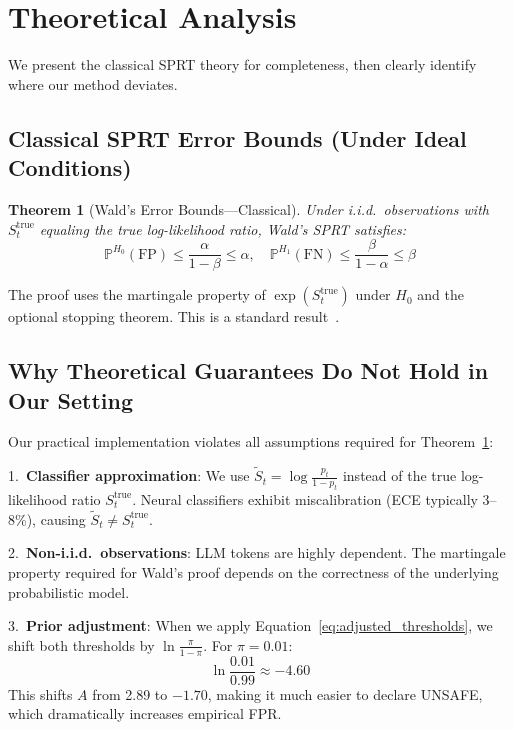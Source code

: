 \documentclass[acmtjournal, acmnowidth]{acmart}
\newcommand{\Hzero}{H_0}
\newcommand{\Hone}{H_1}
\newcommand{\Prob}{\mathbb{P}}
\newtheorem{theorem}{Theorem}[section]
\theoremstyle{definition}
\begin{document}
\section{Theoretical Analysis}

We present the classical SPRT theory for completeness, then clearly identify where our method deviates.

\subsection{Classical SPRT Error Bounds (Under Ideal Conditions)}

\begin{theorem}[Wald's Error Bounds---Classical]
\label{thm:classical_wald}
Under i.i.d.\ observations with $S_t^{\text{true}}$ equaling the true log-likelihood ratio, Wald's SPRT satisfies:
\begin{equation}
\Prob^{\Hzero}(\text{FP}) \leq \frac{\alpha}{1-\beta} \leq \alpha, \quad \Prob^{\Hone}(\text{FN}) \leq \frac{\beta}{1-\alpha} \leq \beta
\end{equation}
\end{theorem}

The proof uses the martingale property of $\exp(S_t^{\text{true}})$ under $\Hzero$ and the optional stopping theorem. This is a standard result~\cite{wald1945}.

\subsection{Why Theoretical Guarantees Do Not Hold in Our Setting}
\label{sec:why_guarantees_dont_hold}

Our practical implementation violates all assumptions required for Theorem~\ref{thm:classical_wald}:

1.~\textbf{Classifier approximation}: We use $\tilde{S}_t = \log\frac{p_t}{1-p_t}$ instead of the true log-likelihood ratio $S_t^{\text{true}}$. Neural classifiers exhibit miscalibration (ECE typically 3--8\%), causing $\tilde{S}_t \neq S_t^{\text{true}}$.

2.~\textbf{Non-i.i.d.\ observations}: LLM tokens are highly dependent. The martingale property required for Wald's proof depends on the correctness of the underlying probabilistic model.

3.~\textbf{Prior adjustment}: When we apply Equation~\ref{eq:adjusted_thresholds}, we shift both thresholds by $\ln\frac{\pi}{1-\pi}$. For $\pi = 0.01$:
\begin{equation}
\ln\frac{0.01}{0.99} \approx -4.60
\end{equation}
This shifts $A$ from 2.89 to $-1.70$, making it much easier to declare UNSAFE, which dramatically increases empirical FPR.
\end{document}
